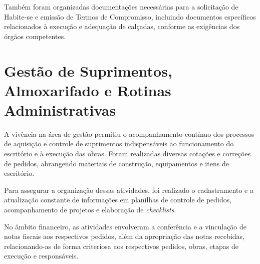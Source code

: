 Também foram organizadas documentações necessárias para a solicitação de Habite-se e emissão de Termos de Compromisso, incluindo documentos específicos relacionados à execução e adequação de calçadas, conforme as exigências dos órgãos competentes.

\section{Gestão de Suprimentos, Almoxarifado e Rotinas Administrativas}

A vivência na área de gestão permitiu o acompanhamento contínuo dos processos de aquisição e controle de suprimentos indispensáveis ao funcionamento do escritório e à execução das obras. Foram realizadas diversas cotações e correções de pedidos, abrangendo materiais de construção, equipamentos e itens de escritório.

Para assegurar a organização dessas atividades, foi realizado o cadastramento e a atualização constante de informações em planilhas de controle de pedidos, acompanhamento de projetos e elaboração de \textit{checklists}.

No âmbito financeiro, as atividades envolveram a conferência e a vinculação de notas fiscais aos respectivos pedidos, além da apropriação das notas recebidas, relacionando-as de forma criteriosa aos respectivos pedidos, obras, etapas de execução e responsáveis.